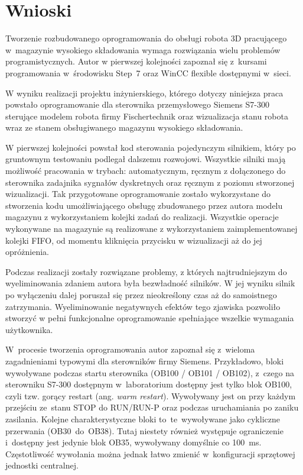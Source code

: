 \section{Wnioski}
Tworzenie rozbudowanego oprogramowania do obsługi robota 3D pracującego w~magazynie wysokiego składowania wymaga rozwiązania wielu problemów programistycznych. Autor w pierwszej kolejności zapoznał się z~kursami programowania w~środowisku Step~7 oraz WinCC flexible \cite{kurs1,kurs2,kurs3} dostępnymi w~sieci.

W wyniku realizacji projektu inżynierskiego, którego dotyczy niniejsza praca powstało oprogramowanie dla sterownika przemysłowego Siemens S7-300 sterujące modelem robota firmy Fischertechnik oraz wizualizacja stanu robota wraz ze stanem obsługiwanego magazynu wysokiego składowania.

W pierwszej kolejności powstał kod sterowania pojedynczym silnikiem, który po gruntownym testowaniu podlegał dalszemu rozwojowi. Wszystkie silniki mają możliwość pracowania w trybach: automatycznym, ręcznym z dołączonego do sterownika zadajnika sygnałów dyskretnych oraz ręcznym z poziomu stworzonej wizualizacji. Tak przygotowane oprogramowanie zostało wykorzystane do stworzenia kodu umożliwiającego obsługę zbudowanego przez autora modelu magazynu z wykorzystaniem kolejki zadań do realizacji. Wszystkie operacje wykonywane na magazynie są realizowane z wykorzystaniem zaimplementowanej kolejki FIFO, od momentu kliknięcia przycisku w wizualizacji aż do jej opróżnienia.

Podczas realizacji zostały rozwiązane problemy, z których najtrudniejszym do wyeliminowania zdaniem autora była bezwładność silników. W jej wyniku silnik po wyłączeniu dalej poruszał się przez nieokreślony czas aż do samoistnego zatrzymania. Wyeliminowanie negatywnych efektów tego zjawiska pozwoliło stworzyć w pełni funkcjonalne oprogramowanie spełniające wszelkie wymagania użytkownika.

W~procesie tworzenia oprogramowania autor zapoznał się z~wieloma zagadnieniami typowymi dla sterowników firmy Siemens. Przykładowo, bloki wywoływane podczas startu sterownika (OB100 / OB101 / OB102), z~czego na sterowniku S7-300 dostępnym w~laboratorium dostępny jest tylko blok OB100, czyli tzw. gorący restart (ang. \emph{warm restart}). Wywoływany jest on przy każdym przejściu ze~stanu STOP do RUN/RUN-P oraz podczas uruchamiania po zaniku zasilania.
Kolejne charakterystyczne bloki to~te~wywoływane jako cykliczne przerwania (OB30~do~OB38). Tutaj niestety również występuje ograniczenie i~dostępny jest jedynie blok OB35, wywoływany domyślnie co 100~ms. Częstotliwość wywołania można jednak łatwo zmienić w~konfiguracji sprzętowej jednostki centralnej.

